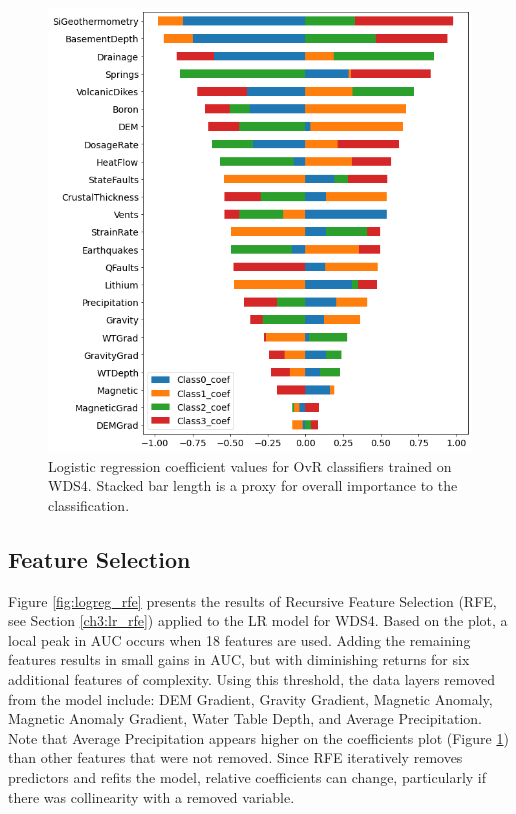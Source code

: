 \begin{figure}
\centering
\includegraphics[width=\textwidth]{templates/images/Figure-LR-coefficients.png}
\singlespacing
\caption[Logistic regression feature coefficients]{Logistic regression coefficient values for OvR classifiers trained on WDS4. Stacked bar length is a proxy for overall importance to the classification.}
\label{fig:logreg_coefs}
\end{figure}

\subsection{Feature Selection} \label{ch5:lr_feature_selection}
Figure \ref{fig:logreg_rfe} presents the results of Recursive Feature Selection (RFE, see Section \ref{ch3:lr_rfe}) applied to the LR model for WDS4. Based on the plot, a local peak in AUC occurs when 18 features are used. Adding the remaining features results in small gains in AUC, but with diminishing returns for six additional features of complexity. Using this threshold, the data layers removed from the model include: DEM Gradient, Gravity Gradient, Magnetic Anomaly, Magnetic Anomaly Gradient, Water Table Depth, and Average Precipitation. Note that Average Precipitation appears higher on the coefficients plot (Figure \ref{fig:logreg_coefs}) than other features that were not removed. Since RFE iteratively removes predictors and refits the model, relative coefficients can change, particularly if there was collinearity with a removed variable.

